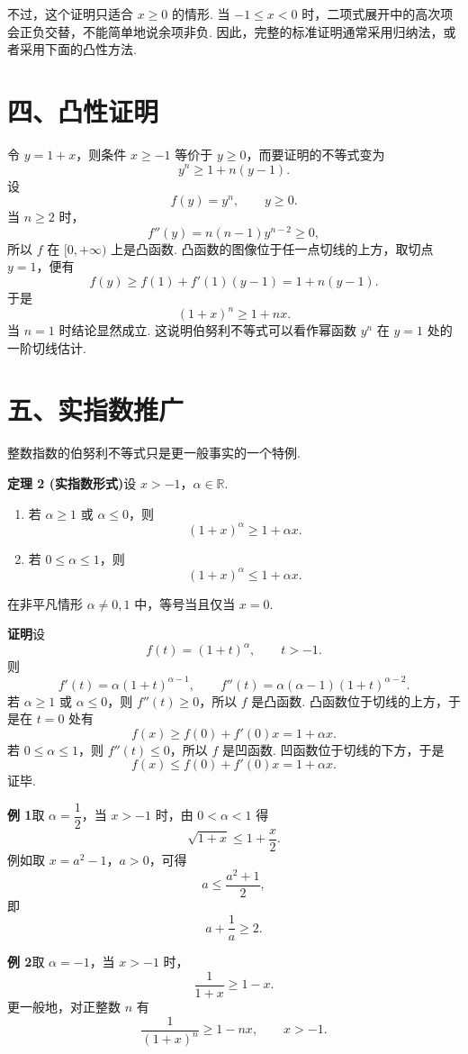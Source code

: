 \documentclass[UTF8,12pt,a4paper,fontset=fandol]{ctexart}
\begin{document}
不过，这个证明只适合 $x\ge0$ 的情形. 当 $-1\le x<0$ 时，二项式展开中的高次项会正负交替，不能简单地说余项非负. 因此，完整的标准证明通常采用归纳法，或者采用下面的凸性方法.

\section*{四、凸性证明}

令 $y=1+x$，则条件 $x\ge -1$ 等价于 $y\ge0$，而要证明的不等式变为
\[
  y^n\ge 1+n(y-1).
\]
设
\[
  f(y)=y^n,\qquad y\ge0.
\]
当 $n\ge2$ 时，
\[
  f''(y)=n(n-1)y^{n-2}\ge0,
\]
所以 $f$ 在 $[0,+\infty)$ 上是凸函数. 凸函数的图像位于任一点切线的上方，取切点 $y=1$，便有
\[
  f(y)\ge f(1)+f'(1)(y-1)=1+n(y-1).
\]
于是
\[
  (1+x)^n\ge1+nx.
\]
当 $n=1$ 时结论显然成立. 这说明伯努利不等式可以看作幂函数 $y^n$ 在 $y=1$ 处的一阶切线估计.

\section*{五、实指数推广}

整数指数的伯努利不等式只是更一般事实的一个特例.

\noindent\textbf{定理 2 (实指数形式)}\quad 设 $x>-1$，$\alpha\in\mathbb R$.
\begin{enumerate}
  \item 若 $\alpha\ge1$ 或 $\alpha\le0$，则
  \[
    (1+x)^\alpha\ge1+\alpha x.
  \]
  \item 若 $0\le\alpha\le1$，则
  \[
    (1+x)^\alpha\le1+\alpha x.
  \]
\end{enumerate}
在非平凡情形 $\alpha\ne0,1$ 中，等号当且仅当 $x=0$.

\noindent\textbf{证明}\quad 设
\[
  f(t)=(1+t)^\alpha,\qquad t>-1.
\]
则
\[
  f'(t)=\alpha(1+t)^{\alpha-1},\qquad
  f''(t)=\alpha(\alpha-1)(1+t)^{\alpha-2}.
\]
若 $\alpha\ge1$ 或 $\alpha\le0$，则 $f''(t)\ge0$，所以 $f$ 是凸函数. 凸函数位于切线的上方，于是在 $t=0$ 处有
\[
  f(x)\ge f(0)+f'(0)x=1+\alpha x.
\]
若 $0\le\alpha\le1$，则 $f''(t)\le0$，所以 $f$ 是凹函数. 凹函数位于切线的下方，于是
\[
  f(x)\le f(0)+f'(0)x=1+\alpha x.
\]
证毕.

\noindent\textbf{例 1}\quad 取 $\alpha=\dfrac12$，当 $x>-1$ 时，由 $0<\alpha<1$ 得
\[
  \sqrt{1+x}\le 1+\frac{x}{2}.
\]
例如取 $x=a^2-1$，$a>0$，可得
\[
  a\le \frac{a^2+1}{2},
\]
即
\[
  a+\frac1a\ge2.
\]

\noindent\textbf{例 2}\quad 取 $\alpha=-1$，当 $x>-1$ 时，
\[
  \frac1{1+x}\ge1-x.
\]
更一般地，对正整数 $n$ 有
\[
  \frac1{(1+x)^n}\ge1-nx,\qquad x>-1.
\]
\end{document}
